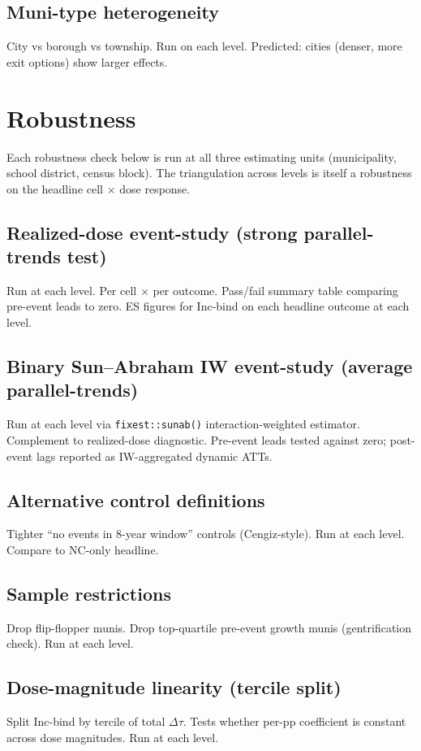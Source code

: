 \documentclass{article}
\begin{document}
\subsection{Muni-type heterogeneity}
City vs borough vs township. Run on each level. Predicted: cities
(denser, more exit options) show larger effects.

\section{Robustness}

Each robustness check below is run at all three estimating units
(municipality, school district, census block). The triangulation
across levels is itself a robustness on the headline cell $\times$
dose response.

\subsection{Realized-dose event-study (strong parallel-trends test)}
Run at each level. Per cell $\times$ per outcome. Pass/fail summary
table comparing pre-event leads to zero. ES figures for Inc-bind on
each headline outcome at each level.

\subsection{Binary Sun--Abraham IW event-study (average parallel-trends)}
Run at each level via \texttt{fixest::sunab()} interaction-weighted
estimator. Complement to realized-dose diagnostic. Pre-event leads
tested against zero; post-event lags reported as IW-aggregated dynamic
ATTs.

\subsection{Alternative control definitions}
Tighter ``no events in 8-year window'' controls (Cengiz-style).
Run at each level. Compare to NC-only headline.

\subsection{Sample restrictions}
Drop flip-flopper munis. Drop top-quartile pre-event growth munis
(gentrification check). Run at each level.

\subsection{Dose-magnitude linearity (tercile split)}
Split Inc-bind by tercile of total $\Delta\tau$. Tests whether per-pp
coefficient is constant across dose magnitudes. Run at each level.
\end{document}
